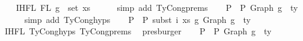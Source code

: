 \begin{isabellebody}
\isanewline
\ \ \isamarkupfalse%
\ IHFL{}{\isacharcolon}{\kern0pt}\ {\isachardoublequoteopen}FL\ g{}\ {\isacharequal}{\kern0pt}\ set\ xs{\isachardoublequoteclose}\isanewline
\ \ \ \ \isamarkupfalse%
\ {\isacharparenleft}{\kern0pt}simp\ add{\isacharcolon}{\kern0pt}\ TyCong{\isachardot}{\kern0pt}prems{\isacharparenleft}{\kern0pt}{}{\isacharparenright}{\kern0pt}{\isacharparenright}{\kern0pt}\isanewline
\isanewline
\ \ \isamarkupfalse%
\ P{}{\isacharcolon}{\kern0pt}\ {\isachardoublequoteopen}{\isasymGamma}{\isacharprime}{\kern0pt}\ {\isasymturnstile}{\isacharbraceleft}{\kern0pt}P{\isacharbraceright}{\kern0pt}\ {\isacharparenleft}{\kern0pt}Graph\ g{}{\isacharprime}{\kern0pt}{\isacharparenright}{\kern0pt}\ {\isacharcolon}{\kern0pt}\ ty{\isacharprime}{\kern0pt}{\isachardoublequoteclose}\isanewline
\ \ \ \ \isamarkupfalse%
\ {\isacharparenleft}{\kern0pt}simp\ add{\isacharcolon}{\kern0pt}\ TyCong{\isachardot}{\kern0pt}hyps{\isacharparenleft}{\kern0pt}{}{\isacharparenright}{\kern0pt}{\isacharparenright}{\kern0pt}\isanewline
\ \ \isamarkupfalse%
\ P{}{\isacharcolon}{\kern0pt}\ {\isachardoublequoteopen}{\isasymGamma}{}\ {\isasymturnstile}{\isacharbraceleft}{\kern0pt}P{\isacharbraceright}{\kern0pt}\ {\isacharparenleft}{\kern0pt}subst\ i\ xs\ g{}\ {\isacharparenleft}{\kern0pt}{\isacharparenleft}{\kern0pt}Graph\ g{}{\isacharprime}{\kern0pt}{\isacharparenright}{\kern0pt}{\isacharparenright}{\kern0pt}{\isacharparenright}{\kern0pt}\ {\isacharcolon}{\kern0pt}\ ty{\isacharprime}{\kern0pt}{\isachardoublequoteclose}\isanewline
\ \ \ \ \isamarkupfalse%
\ IHFL{}\ TyCong{\isachardot}{\kern0pt}hyps{\isacharparenleft}{\kern0pt}{}{\isacharparenright}{\kern0pt}\ TyCong{\isachardot}{\kern0pt}prems{\isacharparenleft}{\kern0pt}{}{\isacharcomma}{\kern0pt}{}{\isacharcomma}{\kern0pt}{}{\isacharcomma}{\kern0pt}{}{\isacharparenright}{\kern0pt}\ \isamarkupfalse%
\ presburger\isanewline
\ \ \isamarkupfalse%
\ P{}{\isacharcolon}{\kern0pt}\ {\isachardoublequoteopen}{\isasymGamma}{\isacharprime}{\kern0pt}\ {\isasymturnstile}{\isacharbraceleft}{\kern0pt}P{\isacharbraceright}{\kern0pt}\ {\isacharparenleft}{\kern0pt}Graph\ g{}{\isacharprime}{\kern0pt}{\isacharparenright}{\kern0pt}\ {\isacharcolon}{\kern0pt}\ ty{\isacharprime}{\kern0pt}{\isachardoublequoteclose}\isanewline

\end{isabellebody}

